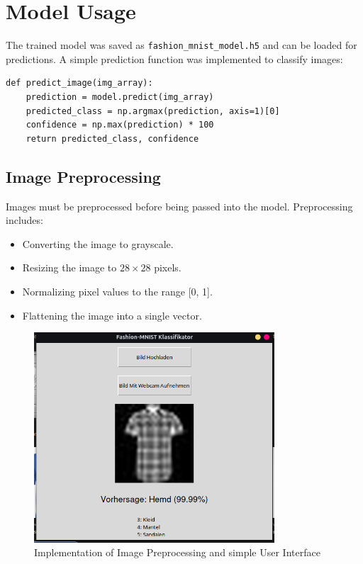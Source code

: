 \documentclass[12pt,a4paper]{article}
\begin{document}
\section*{Model Usage}
The trained model was saved as \texttt{fashion\_mnist\_model.h5} and can be loaded for predictions. A simple prediction function was implemented to classify images:
\begin{lstlisting}
def predict_image(img_array):
    prediction = model.predict(img_array)
    predicted_class = np.argmax(prediction, axis=1)[0]
    confidence = np.max(prediction) * 100
    return predicted_class, confidence
\end{lstlisting}

\subsection*{Image Preprocessing}
Images must be preprocessed before being passed into the model. Preprocessing includes:
\begin{itemize}
    \item Converting the image to grayscale.
    \item Resizing the image to $28 \times 28$ pixels.
    \item Normalizing pixel values to the range [0, 1].
    \item Flattening the image into a single vector.
\end{itemize}


\begin{figure}[h!]
    \centering
    \includegraphics[width=0.8\textwidth]{image-3.png}
    \caption{Implementation of Image Preprocessing and simple User Interface}
    \label{fig:training-curves}
\end{figure}
\end{document}
